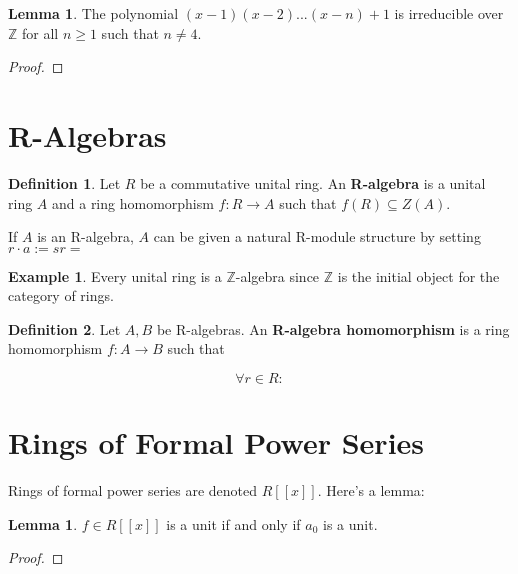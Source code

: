 \documentclass{article}
\theoremstyle{definition}
\newtheorem{definition}{Definition}
\newtheorem{lemma}[theorem]{Lemma}
\newtheorem{example}[theorem]{Example}
\newcommand{\Z}{\mathbb{Z}}
\begin{document}
\begin{lemma}
    The polynomial $(x-1)(x-2)...(x-n) + 1$ is irreducible over $\mathbb{Z}$ for all $n \geq 1$ such that $n \neq 4$.
\end{lemma}
\begin{proof}
    
\end{proof}

\newpage

\section{R-Algebras}

\begin{definition}
    Let $R$ be a commutative unital ring. An \textbf{R-algebra} is a unital ring $A$
    and a ring homomorphism $f: R \xrightarrow{} A$ such that $f(R) \subseteq Z(A)$.
\end{definition}

If $A$ is an R-algebra, $A$ can be given a natural R-module structure by
setting $r \cdot a := sr =$

\begin{example}
    Every unital ring is a $\Z$-algebra since $\Z$ is the initial
    object for the category of rings.
\end{example}

\begin{definition}
    Let $A,B$ be R-algebras. An \textbf{R-algebra homomorphism} is a ring homomorphism
    $f: A \xrightarrow{} B$ such that 

    \[ \forall r \in R:\]
\end{definition}

\newpage

\section{Rings of Formal Power Series}

Rings of formal power series are denoted $R[[x]]$. Here's a lemma:

\begin{lemma}
    $f \in R[[x]]$ is a unit if and only if $a_{0}$ is a unit.
\end{lemma}
\begin{proof}
    
\end{proof}
\end{document}
